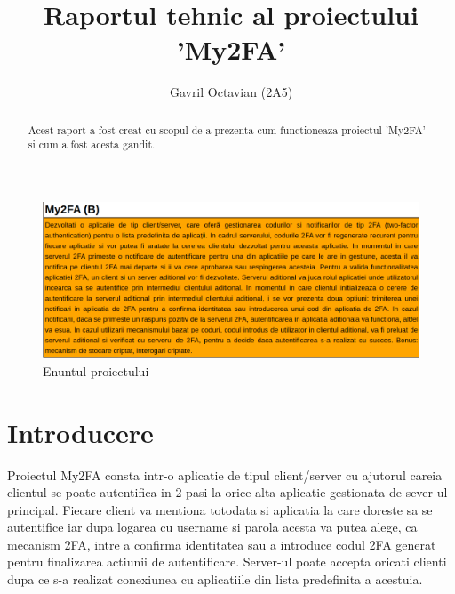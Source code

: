 \documentclass[runningheads]{llncs}
\begin{document}
\title{Raportul tehnic al proiectului 'My2FA'}
\author{Gavril Octavian (2A5)}

\maketitle              

\begin{abstract}
Acest raport a fost creat cu scopul de a prezenta cum functioneaza proiectul 'My2FA' si cum a fost acesta gandit. 

\end{abstract}

\begin{figure}
\includegraphics[width=\textwidth]{enunt}
\caption{Enuntul proiectului}
\end{figure}
\vspace{4cm}
\section{Introducere}

\hspace{10pt} Proiectul My2FA consta intr-o aplicatie de tipul client/server cu ajutorul careia clientul se poate autentifica in 2 pasi la orice alta aplicatie gestionata de sever-ul principal. Fiecare client va mentiona totodata si aplicatia la care doreste sa se autentifice iar dupa logarea cu username si parola acesta va putea alege, ca mecanism 2FA, intre a confirma identitatea sau a introduce codul 2FA generat pentru finalizarea actiunii de autentificare. Server-ul poate accepta oricati clienti dupa ce s-a realizat conexiunea cu aplicatiile din lista predefinita a acestuia.
\end{document}

